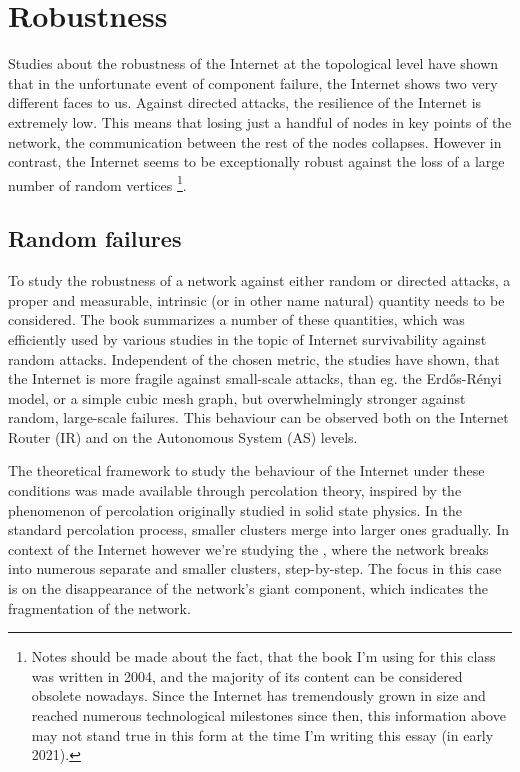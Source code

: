 \section{Robustness}
Studies about the robustness of the Internet at the topological level have shown that in the unfortunate event of component failure, the Internet shows two very different faces to us. Against directed attacks, the resilience of the Internet is extremely low. This means that losing just a handful of nodes in key points of the network, the communication between the rest of the nodes collapses. However in contrast, the Internet seems to be exceptionally robust against the loss of a large number of random vertices \footnote{Notes should be made about the fact, that the book I'm using for this class was written in 2004, and the majority of its content can be considered obsolete nowadays. Since the Internet has tremendously grown in size and reached numerous technological milestones since then, this information above may not stand true in this form at the time I'm writing this essay (in early 2021).}.

\subsection{Random failures}
To study the robustness of a network against either random or directed attacks, a proper and measurable, intrinsic (or in other name natural) quantity needs to be considered. The book summarizes a number of these quantities, which was efficiently used by various studies in the topic of Internet survivability against random attacks. Independent of the chosen metric, the studies have shown, that the Internet is more fragile against small-scale attacks, than eg. the Erdős-Rényi model, or a simple cubic mesh graph, but overwhelmingly stronger against random, large-scale failures. This behaviour can be observed both on the Internet Router (IR) and on the Autonomous System (AS) levels.

The theoretical framework to study the behaviour of the Internet under these conditions was made available through percolation theory, inspired by the phenomenon of percolation originally studied in solid state physics. In the standard percolation process, smaller clusters merge into larger ones gradually. In context of the Internet however we're studying the , where the network breaks into numerous separate and smaller clusters, step-by-step. The focus in this case is on the disappearance of the network's giant component, which indicates the fragmentation of the network.

